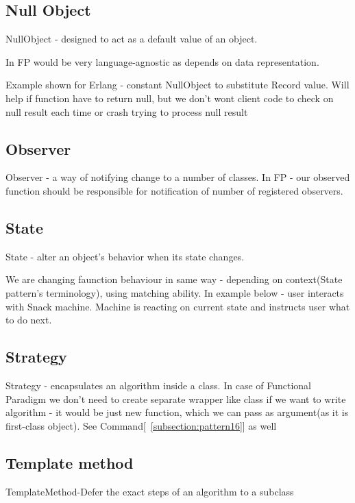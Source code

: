 \subsection{Null Object} \label{subsection:pattern21}
NullObject - designed to act as a default value of an object. 

In FP would be very language-agnostic as depends on data representation.

Example shown for Erlang - constant NullObject to substitute Record value. Will help if function have to return null, but we don't wont client code to check on null result each time or crash trying to process null result

\subsection{Observer} \label{subsection:pattern22}
    Observer - a way of notifying change to a number of classes. In FP - our observed function should be responsible for notification of number of registered observers. 

\subsection{State} \label{subsection:pattern23}
    State - alter an object's behavior when its state changes. 
    
    We are changing faunction behaviour in same way - depending on context(State pattern's terminology), using matching ability. In example below - user interacts with Snack machine. Machine is reacting on current state and instructs user what to do next.

\subsection{Strategy} \label{subsection:pattern24}
    Strategy - encapsulates an algorithm inside a class. In case of Functional Paradigm we don't need to create separate wrapper like class if we want to write algorithm - it would be just new function, which we can pass as argument(as it is first-class object). See Command[~\ref{subsection:pattern16}] as well

\subsection{Template method} \label{subsection:pattern25}
    TemplateMethod-Defer the exact steps of an algorithm to a subclass

